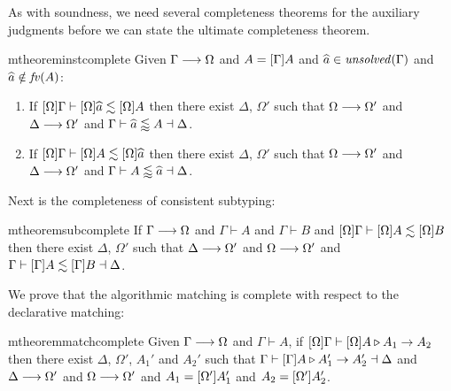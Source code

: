 As with soundness, we need several completeness theorems for the auxiliary
judgments before we can state the ultimate completeness theorem.

\begin{restatable}{mtheorem}{instcomplete}  \label{thm:inst_complete}%
  Given $\Gamma \longrightarrow \Omega$ and $A = [\Gamma]A$ and $\widehat{a} \in
  \mathit{unsolved}(\Gamma)$ and $\widehat{a} \notin \mathit{fv}(A)$:
  \begin{enumerate}
  \item If $[\Omega]\Gamma \vdash [\Omega]\widehat{a} \lesssim
    [\Omega]A$ then there exist $\Delta$, $\Omega'$ such that $\Omega \longrightarrow
    \Omega'$ and $\Delta \longrightarrow \Omega'$ and $\Gamma \vdash \widehat{a} \lessapprox A \dashv \Delta$.
  \item If $[\Omega]\Gamma \vdash [\Omega]A \lesssim
    [\Omega]\widehat{a}$ then there exist $\Delta$, $\Omega'$ such that $\Omega \longrightarrow
    \Omega'$ and $\Delta \longrightarrow \Omega'$ and $\Gamma \vdash A \lessapprox \widehat{a} \dashv \Delta$.
  \end{enumerate}
\end{restatable}


Next is the completeness of consistent subtyping:

\begin{restatable}{mtheorem}{subcomplete}  \label{thm:sub_completeness}%
  If $\Gamma \longrightarrow \Omega$ and $\Gamma \vdash A$ and $\Gamma \vdash B$ and
  $[\Omega]\Gamma \vdash [\Omega]A \lesssim
  [\Omega]B$ then there exist $\Delta$, $\Omega'$ such that $\Delta
  \longrightarrow \Omega'$ and $\Omega \longrightarrow \Omega'$ and $\Gamma \vdash
  [\Gamma]A \lesssim [\Gamma]B \dashv \Delta$.
\end{restatable}


We prove that the algorithmic matching is complete with respect to the
declarative matching:

\begin{restatable}{mtheorem}{matchcomplete} \label{thm:match_complete}%
  Given $\Gamma \longrightarrow \Omega$ and $\Gamma \vdash A$, if
  $[\Omega]\Gamma \vdash [\Omega]A \triangleright A_1 \to A_2$
  then there exist $\Delta$, $\Omega'$, $A_1'$ and $A_2'$ such that $\Gamma
  \vdash [\Gamma]A \triangleright A_1' \to A_2' \dashv \Delta$ and $\Delta \longrightarrow \Omega'$ and
  $\Omega \longrightarrow \Omega'$ and $A_1 = [\Omega']A_1'$ and $A_2 =
  [\Omega']A_2'$.
\end{restatable}


